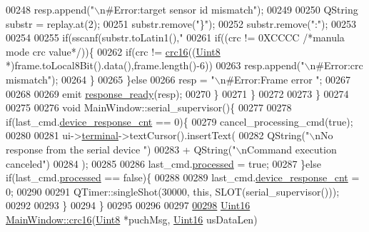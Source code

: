 \begin{DoxyCode}
{{00248               resp.append(\textcolor{stringliteral}{"\(\backslash\)n#Error:target sensor id mismatch"});
00249 
00250           QString substr = replay.at(2);
00251            substr.remove(\textcolor{stringliteral}{"\}"});
00252            substr.remove(\textcolor{stringliteral}{":"});
00253 
00254 
00255           \textcolor{keywordflow}{if}(sscanf(substr.toLatin1(),\textcolor{stringliteral}{"%
00261               \textcolor{keywordflow}{if}((crc != 0XCCCC \textcolor{comment}{/*manula mode crc value*/}))\{
00262               \textcolor{keywordflow}{if}(crc != \hyperlink{a00006_a09ae3cafdd3692fb9fb93bb90a0348d2}{crc16}((\hyperlink{a00001_a979e3e23b9a449e69ab6a8a83b6042f8}{Uint8} *)frame.toLocal8Bit().data(),frame.length()-6))
00263                 resp.append(\textcolor{stringliteral}{"\(\backslash\)n#Error:crc mismatch"});
00264               \}
00265           \}\textcolor{keywordflow}{else}
00266               resp = \textcolor{stringliteral}{"\(\backslash\)n#Error:Frame error "};
00267 
00268 
00269               emit \hyperlink{a00006_a3f6396874778799cf07a7a0149e54977}{response\_ready}(resp);
00270         \}
00271     \}
00272 
00273 \}
00274 
00275 
00276 \textcolor{keywordtype}{void} MainWindow::serial\_supervisor()\{
00277 
00278     \textcolor{keywordflow}{if}(last\_cmd.\hyperlink{a00001_a2b37e66e2555cf1dc26439ad7c30ea78}{device\_response\_cnt} == 0)\{
00279         cancel\_processing\_cmd(\textcolor{keyword}{true});
00280 
00281         ui->\hyperlink{a00027_aae71c46ea4546df5994735dee573b2dd}{terminal}->textCursor().insertText(
00282        QString(\textcolor{stringliteral}{"\(\backslash\)nNo response from the serial device "})
00283        + QString(\textcolor{stringliteral}{"\(\backslash\)nCommand execution canceled"})
00284                     );
00285 
00286         last\_cmd.\hyperlink{a00001_a3e88f779da9798a5da7dda227e2ca388}{processed} = \textcolor{keyword}{true};
00287    \}\textcolor{keywordflow}{else} \textcolor{keywordflow}{if}(last\_cmd.\hyperlink{a00001_a3e88f779da9798a5da7dda227e2ca388}{processed} == \textcolor{keyword}{false})\{
00288 
00289         last\_cmd.\hyperlink{a00001_a2b37e66e2555cf1dc26439ad7c30ea78}{device\_response\_cnt} = 0;
00290 
00291         QTimer::singleShot(30000, \textcolor{keyword}{this}, SLOT(serial\_supervisor()));
00292 
00293     \}
00294 \}
00295 
00296 
00297 
\hypertarget{a00050_source_l00298}{}\hyperlink{a00006_a09ae3cafdd3692fb9fb93bb90a0348d2}{00298} \hyperlink{a00001_aae7407b021d43f7193a81a58cfb3e297}{Uint16} \hyperlink{a00006_a09ae3cafdd3692fb9fb93bb90a0348d2}{MainWindow::crc16}(\hyperlink{a00001_a979e3e23b9a449e69ab6a8a83b6042f8}{Uint8} *puchMsg, \hyperlink{a00001_aae7407b021d43f7193a81a58cfb3e297}{Uint16} usDataLen)
}}}
\end{DoxyCode}
